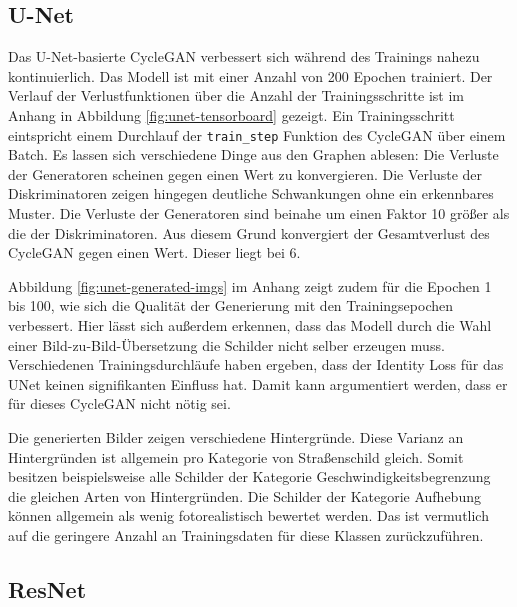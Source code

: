 \subsection{U-Net}
Das U-Net-basierte \ac{CycleGAN} verbessert sich während des Trainings nahezu kontinuierlich. Das Modell ist mit einer Anzahl von 200 Epochen trainiert. Der Verlauf der Verlustfunktionen über die Anzahl der Trainingsschritte ist im Anhang in Abbildung \ref{fig:unet-tensorboard} gezeigt. Ein Trainingsschritt eintspricht einem Durchlauf der \texttt{train_step} Funktion des \ac{CycleGAN} über einem Batch.  Es lassen sich verschiedene Dinge aus den Graphen ablesen: Die Verluste der Generatoren scheinen gegen einen Wert zu konvergieren. Die Verluste der Diskriminatoren zeigen hingegen deutliche Schwankungen ohne ein erkennbares Muster. Die Verluste der Generatoren sind beinahe um einen Faktor 10 größer als die der Diskriminatoren. Aus diesem Grund konvergiert der Gesamtverlust des \ac{CycleGAN} gegen einen Wert. Dieser liegt bei 6.

Abbildung \ref{fig:unet-generated-imgs} im Anhang zeigt zudem für die Epochen 1 bis 100, wie sich die Qualität der Generierung mit den Trainingsepochen verbessert. Hier lässt sich außerdem erkennen, dass das Modell durch die Wahl einer Bild-zu-Bild-Übersetzung die Schilder nicht selber erzeugen muss. Verschiedenen Trainingsdurchläufe haben ergeben, dass der Identity Loss für das UNet keinen signifikanten Einfluss hat. Damit kann argumentiert werden, dass er für dieses \ac{CycleGAN} nicht nötig sei.

Die generierten Bilder zeigen verschiedene Hintergründe. Diese Varianz an Hintergründen ist allgemein pro Kategorie von Straßenschild gleich. Somit besitzen beispielsweise alle Schilder der Kategorie Geschwindigkeitsbegrenzung die gleichen Arten von Hintergründen. Die Schilder der Kategorie Aufhebung können allgemein als wenig fotorealistisch bewertet werden. Das ist vermutlich auf die geringere Anzahl an Trainingsdaten für diese Klassen zurückzuführen.


\subsection{ResNet}

